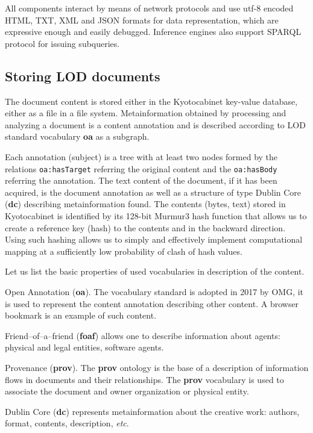 \documentclass[conference,a4paper]{IEEEtran}
\begin{document}
All components interact by means of network protocols and use utf-8 encoded HTML, TXT, XML and JSON formats for data representation, which are expressive enough and easily debugged.  Inference engines also support SPARQL protocol for issuing subqueries.

\subsection{Storing LOD documents}

The document content is stored either in the Kyotocabinet key-value database, either as a file in a file system.  Metainformation obtained by processing and analyzing a document is a content annotation and is described according to LOD standard vocabulary \textbf{oa} as a subgraph.

Each annotation (subject) is a tree with at least two nodes formed by the relations \texttt{oa:hasTarget} referring the original content and the \texttt{oa:hasBody} referring the annotation.  The text content of the document, if it has been acquired, is the document annotation as well as a structure of type Dublin Core (\textbf{dc}) describing metainformation found.  The contents (bytes, text) stored in Kyotocabinet is identified by its 128-bit Murmur3 hash function that allows us to create a reference key (hash) to the contents and in the backward direction.  Using such hashing allows us to simply and effectively implement computational mapping at a sufficiently low probability of clash of hash values.

Let us list the basic properties of used vocabularies in description of the content.

Open Annotation (\textbf{oa}). The vocabulary standard is adopted in 2017 by OMG, it is used to represent the content annotation describing other content.  A browser bookmark is an example of such content.

Friend--of--a--friend (\textbf{foaf}) allows one to describe information about agents: physical and legal entities, software agents.

Provenance (\textbf{prov}).  The \textbf{prov} ontology is the base of a description of information flows in documents and their relationships. The \textbf{prov} vocabulary is used to associate the document and owner organization or physical entity.

Dublin Core (\textbf{dc}) represents metainformation about the creative work: authors, format, contents, description, \emph{etc}.
\end{document}
